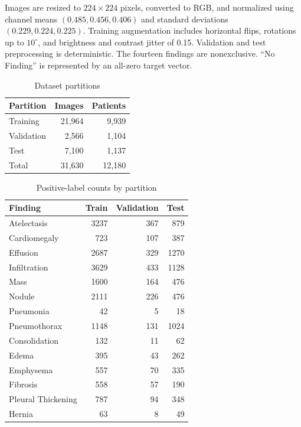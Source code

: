 \documentclass[pdflatex,sn-mathphys-num]{sn-jnl}
\begin{document}
Images are resized to $224\times224$ pixels, converted to RGB, and normalized using channel means $(0.485,0.456,0.406)$ and standard deviations $(0.229,0.224,0.225)$. Training augmentation includes horizontal flips, rotations up to $10^\circ$, and brightness and contrast jitter of 0.15. Validation and test preprocessing is deterministic. The fourteen findings are nonexclusive. ``No Finding'' is represented by an all-zero target vector.

\begin{table}[htbp]
\caption{Dataset partitions}
\label{tab:split}
\centering\small
\begin{tabular}{lrr}
\toprule
Partition & Images & Patients\\
\midrule
Training & 21,964 & 9,939\\
Validation & 2,566 & 1,104\\
Test & 7,100 & 1,137\\
\midrule
Total & 31,630 & 12,180\\
\bottomrule
\end{tabular}
\end{table}

\begin{table}[htbp]
\caption{Positive-label counts by partition}
\label{tab:prevalence}
\centering\small
\begin{tabular}{lrrr}
\toprule
Finding & Train & Validation & Test\\
\midrule
Atelectasis & 3237 & 367 & 879\\
Cardiomegaly & 723 & 107 & 387\\
Effusion & 2687 & 329 & 1270\\
Infiltration & 3629 & 433 & 1128\\
Mass & 1600 & 164 & 476\\
Nodule & 2111 & 226 & 476\\
Pneumonia & 42 & 5 & 18\\
Pneumothorax & 1148 & 131 & 1024\\
Consolidation & 132 & 11 & 62\\
Edema & 395 & 43 & 262\\
Emphysema & 557 & 70 & 335\\
Fibrosis & 558 & 57 & 190\\
Pleural Thickening & 787 & 94 & 348\\
Hernia & 63 & 8 & 49\\
\bottomrule
\end{tabular}
\end{table}
\end{document}
